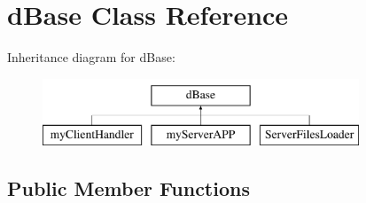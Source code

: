 \hypertarget{classdBase}{
\section{dBase Class Reference}
\label{classdBase}
}
Inheritance diagram for dBase:\begin{figure}[H]
\begin{center}
\leavevmode
\includegraphics[height=2cm]{classdBase}
\end{center}
\end{figure}
\subsection*{Public Member Functions}
